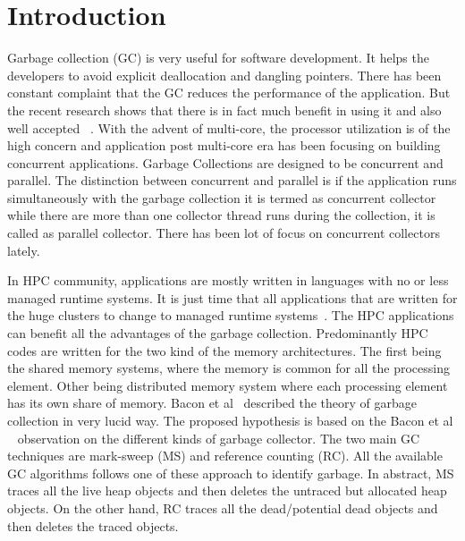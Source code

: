 \section{Introduction}
Garbage collection (GC) is very useful for software development. It helps the developers to avoid explicit deallocation and dangling pointers. There has been constant complaint that the GC reduces the performance of the application. But the recent research shows that there is in fact much benefit in using it and also well accepted ~\cite{Butters2007}. With the advent of multi-core, the processor utilization is of the high concern and application post multi-core era has been focusing on building concurrent applications. Garbage Collections are designed to be concurrent and parallel. The distinction between concurrent and parallel is if the application runs simultaneously with the garbage collection it is termed as concurrent collector while there are more than one collector thread runs during the collection, it is called as parallel collector. There has been lot of focus on concurrent collectors lately. 

In HPC community, applications are mostly written in languages with no or less managed runtime systems. It is just time that all applications that are written for the huge clusters to change to managed runtime systems~\cite{Endo,APPELSGC}. The HPC applications can benefit all the advantages of the garbage collection. Predominantly HPC codes are written for the two kind of the memory architectures. The first being the shared memory systems, where the memory is common for all the processing element. Other being distributed memory system where each processing element has its own share of memory. Bacon et al~\cite{BaconUTGC} described the theory of garbage collection in very lucid way. The proposed hypothesis is based on the Bacon et al ~\cite{BaconUTGC} observation on the different kinds of garbage collector. The two main GC techniques are mark-sweep (MS) and reference counting (RC). All the available GC algorithms follows one of these approach to identify garbage. In abstract, MS traces all the live heap objects and then deletes the untraced but allocated heap objects. On the other hand, RC traces all the dead/potential dead objects and then deletes the traced objects. 

